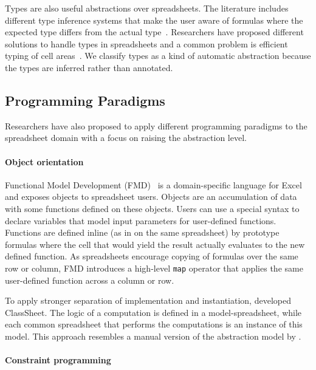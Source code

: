 \documentclass[a4paper]{article}
\begin{document}
Types are also useful abstractions over spreadsheets. The literature includes different type inference systems that make the user aware of formulas where the expected type differs from the actual type~\cite{Abraham:2006:TIS:1140335.1140346, Cheng2015Static}. Researchers have proposed different solutions to handle types in spreadsheets and a common problem is efficient typing of cell areas~\cite{Abraham:2006:TIS:1140335.1140346, Cheng2012Abstract}. We classify types as a kind of automatic abstraction because the types are inferred rather than annotated.

\subsection{Programming Paradigms}
\label{sec:progr-parad}

Researchers have also proposed to apply different programming paradigms to the spreadsheet domain with a focus on raising the abstraction level.

\paragraph{Object orientation}

Functional Model Development (FMD)~\cite{Benfield:2009:FFD:1668113.1668121} is a domain-specific language for Excel and exposes objects to spreadsheet users. Objects are an accumulation of data with some functions defined on these objects. Users can use a special syntax to declare variables that model input parameters for user-defined functions. Functions are defined inline (as in on the same spreadsheet) by prototype formulas where the cell that would yield the result actually evaluates to the new defined function. As spreadsheets encourage copying of formulas over the same row or column, FMD introduces a high-level \texttt{map} operator that applies the same user-defined function across a column or row.

To apply stronger separation of implementation and instantiation, \citet{6070409} developed ClassSheet. The logic of a computation is defined in a model-spreadsheet, while each common spreadsheet that performs the computations is an instance of this model. This approach resembles a manual version of the abstraction model by \citet{Isakowitz:1995:TLT:195705.195708}.

\paragraph{Constraint programming}
\end{document}
